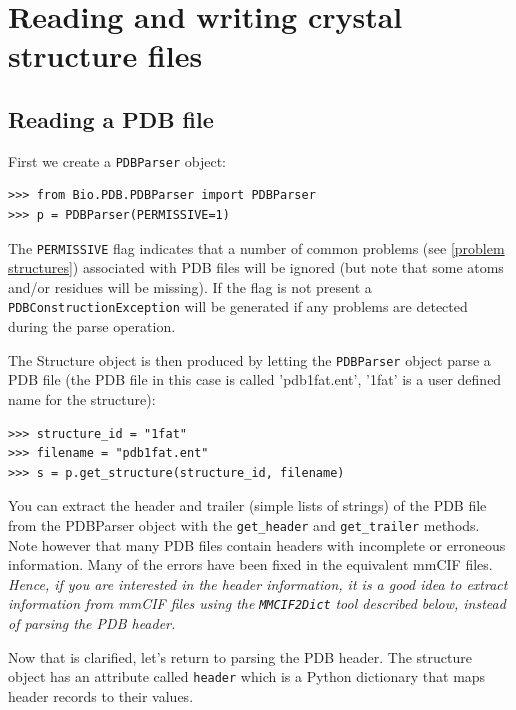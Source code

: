 \documentclass{report}
\begin{document}

\section{Reading and writing crystal structure files}

\subsection{Reading a PDB file}

First we create a \texttt{PDBParser} object:

\begin{verbatim}
>>> from Bio.PDB.PDBParser import PDBParser
>>> p = PDBParser(PERMISSIVE=1)
\end{verbatim}

The {\tt PERMISSIVE} flag indicates that a number of common problems (see \ref{problem structures}) associated with PDB files will be ignored (but note that some atoms and/or residues will be missing). If the flag is not present a {\tt PDBConstructionException} will be generated if any problems are detected during the parse operation.

The Structure object is then produced by letting the \texttt{PDBParser} object parse a PDB file (the PDB file in this case is called 'pdb1fat.ent', '1fat' is a user defined name for the structure):

\begin{verbatim}
>>> structure_id = "1fat"
>>> filename = "pdb1fat.ent"
>>> s = p.get_structure(structure_id, filename)
\end{verbatim}

You can extract the header and trailer (simple lists of strings) of the PDB
file from the PDBParser object with the {\tt get\_header} and {\tt get\_trailer}
methods.  Note however that many PDB files contain headers with
incomplete or erroneous information. Many of the errors have been
fixed in the equivalent mmCIF files. \emph{Hence, if you are interested
in the header information, it is a good idea to extract information
from mmCIF files using the} \texttt{\emph{MMCIF2Dict}} \emph{tool
described below, instead of parsing the PDB header. }

Now that is clarified, let's return to parsing the PDB header. The
structure object has an attribute called \texttt{header} which is
a Python dictionary that maps header records to their values.
\end{document}
